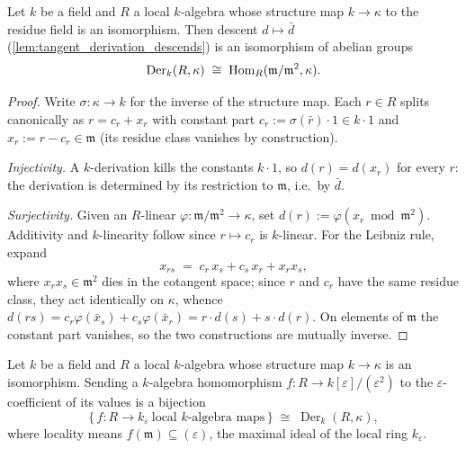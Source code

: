 \begin{lemma}\leanok
  \label{lem:tangent_derivation_cotangent_dual}
  Let \(k\) be a field and \(R\) a local \(k\)-algebra whose
  structure map \(k \to \kappa\) to the residue field is an
  isomorphism. Then descent \(d \mapsto \bar d\)
  (\cref{lem:tangent_derivation_descends}) is an isomorphism of
  abelian groups
  \[
    \operatorname{Der}_k(R, \kappa)
    \;\cong\;
    \operatorname{Hom}_R(\mathfrak m/\mathfrak m^2, \kappa).
  \]
\end{lemma}

\begin{proof}\leanok
  Write \(\sigma : \kappa \to k\) for the inverse of the structure
  map. Each \(r \in R\) splits canonically as
  \(r = c_r + x_r\) with constant part
  \(c_r := \sigma(\bar r) \cdot 1 \in k \cdot 1\) and
  \(x_r := r - c_r \in \mathfrak m\) (its residue class vanishes by
  construction).

  \emph{Injectivity.} A \(k\)-derivation kills the constants
  \(k \cdot 1\), so \(d(r) = d(x_r)\) for every \(r\): the derivation
  is determined by its restriction to \(\mathfrak m\), i.e.\ by
  \(\bar d\).

  \emph{Surjectivity.} Given an \(R\)-linear
  \(\varphi : \mathfrak m/\mathfrak m^2 \to \kappa\), set
  \(d(r) := \varphi(x_r \bmod \mathfrak m^2)\). Additivity and
  \(k\)-linearity follow since \(r \mapsto c_r\) is \(k\)-linear. For
  the Leibniz rule, expand
  \[
    x_{rs} \;=\; c_r\, x_s + c_s\, x_r + x_r x_s ,
  \]
  where \(x_r x_s \in \mathfrak m^2\) dies in the cotangent space;
  since \(r\) and \(c_r\) have the same residue class, they act
  identically on \(\kappa\), whence
  \(d(rs) = c_r \varphi(\bar x_s) + c_s \varphi(\bar x_r)
    = r \cdot d(s) + s \cdot d(r)\).
  On elements of \(\mathfrak m\) the constant part vanishes, so the
  two constructions are mutually inverse.
\end{proof}

\begin{lemma}\leanok
  \label{lem:tangent_dual_number_derivation}
  Let \(k\) be a field and \(R\) a local \(k\)-algebra whose
  structure map \(k \to \kappa\) is an isomorphism. Sending a
  \(k\)-algebra homomorphism \(f : R \to k[\varepsilon]/(\varepsilon^2)\)
  to the \(\varepsilon\)-coefficient of its values is a bijection
  \[
    \{\, f : R \to k_\varepsilon \ \text{local $k$-algebra maps} \,\}
    \;\cong\;
    \operatorname{Der}_k(R, \kappa),
  \]
  where locality means \(f(\mathfrak m) \subseteq (\varepsilon)\),
  the maximal ideal of the local ring \(k_\varepsilon\).
\end{lemma}

